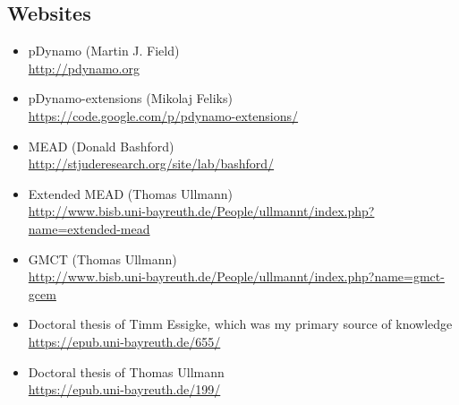 \documentclass[a4paper,11pt]{article}
\begin{document}
\linespread{0.8}



\linespread{1.6}


\subsection*{Websites}

\begin{itemize}
  \item pDynamo (Martin J. Field)\\ \url{http://pdynamo.org}

  \item pDynamo-extensions (Mikolaj Feliks)\\ \url{https://code.google.com/p/pdynamo-extensions/}

  \item MEAD (Donald Bashford)\\ \url{http://stjuderesearch.org/site/lab/bashford/}

  \item Extended MEAD (Thomas Ullmann)\\ \url{http://www.bisb.uni-bayreuth.de/People/ullmannt/index.php?name=extended-mead}

  \item GMCT (Thomas Ullmann)\\ \url{http://www.bisb.uni-bayreuth.de/People/ullmannt/index.php?name=gmct-gcem}

  \item Doctoral thesis of Timm Essigke, which was my primary source of knowledge\\ \url{https://epub.uni-bayreuth.de/655/}

  \item Doctoral thesis of Thomas Ullmann\\ \url{https://epub.uni-bayreuth.de/199/}

\end{itemize}
\end{document}
